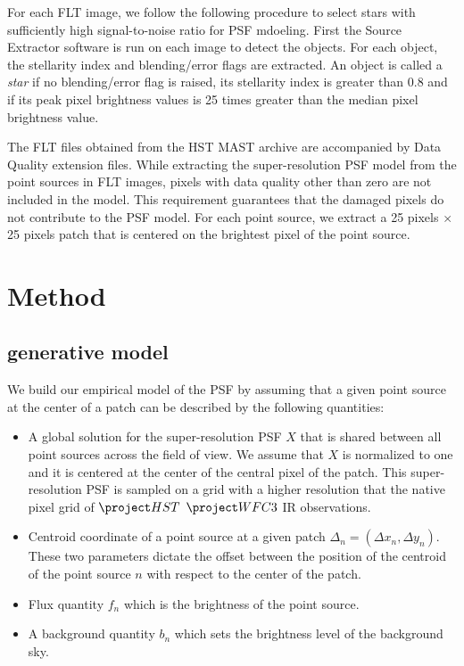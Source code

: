 For each FLT image, we follow the following procedure to select stars with sufficiently high signal-to-noise ratio 
for PSF mdoeling. First the Source Extractor software \citep{sextractor} is run on each image to detect the objects. 
For each object, the stellarity index and blending/error flags are extracted. An object is called a \emph{star} if no blending/error flag is 
raised, its stellarity index is greater than 0.8 and if its peak pixel brightness values is 25 times greater than the median pixel brightness 
value.  

The FLT files obtained from the HST MAST archive are accompanied by Data Quality extension files. While extracting the super-resolution PSF model 
from the point sources in FLT images, pixels with data quality other than zero are not included in the model. This requirement guarantees that 
the damaged pixels do not contribute to the PSF model. For each point source, we extract a 25 pixels $\times$ 25 pixels patch that is centered on the brightest 
pixel of the point source.   

\section{Method}\label{sec:method}

\subsection{generative model}

We build our empirical model of the PSF by assuming that a given point source at the center of a patch can be described by 
the following quantities: 

\begin{itemize}
\item A global solution for the super-resolution PSF $X$ that is shared between all point sources across the field of view. We assume 
that $X$ is normalized to one and it is centered at the center of the central pixel of the patch. This super-resolution PSF is sampled on 
a grid with a higher resolution that the native pixel grid of $\hst$ $\wfc$ IR observations.

\item Centroid coordinate of a point source at a given patch $\Delta_n = (\Delta x_n, \Delta y_n)$. 
These two parameters dictate the offset between the position of the centroid of the point source $n$ with 
respect to the center of the patch.

\item Flux quantity $f_n$ which is the brightness of the point source.

\item A background quantity $b_n$ which sets the brightness level of the background sky.

\end{itemize}

